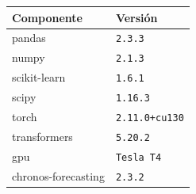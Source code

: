 \begin{tabular}{ll}\toprule
 Componente & Versión \\
\midrule
pandas & \texttt{2.3.3} \\
numpy & \texttt{2.1.3} \\
scikit-learn & \texttt{1.6.1} \\
scipy & \texttt{1.16.3} \\
torch & \texttt{2.11.0+cu130} \\
transformers & \texttt{5.20.2} \\
gpu & \texttt{Tesla T4} \\
chronos-forecasting & \texttt{2.3.2} \\
\bottomrule\end{tabular}
